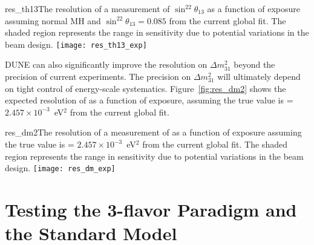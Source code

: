 \begin{cdrfigure}{res_th13}{The resolution of a measurement of $\sin^22\theta_{13}$ as a function of exposure assuming normal MH and $\sin^22\theta_{13} = 0.085$ from the current global fit. The shaded region represents the range in sensitivity due to potential variations in the beam design.  }
 \texttt{[image: res\_th13\_exp]}
\end{cdrfigure}

DUNE can also significantly improve the
resolution on $\Delta m^2_{31}$ beyond the precision of current experiments.  The
precision on $\Delta m^2_{31}$ will ultimately depend on tight control
of energy-scale systematics.  Figure~\ref{fig:res_dm2} shows the expected resolution of  as a function of exposure, assuming the true value is  = $2.457\times10^{-3}$~eV$^2$ from the current global fit.

\begin{cdrfigure}{res_dm2}{The resolution of a measurement of  as a function of exposure assuming the true value is  = $2.457\times10^{-3}$~eV$^2$ from the current global fit. The shaded region represents the range in sensitivity due to potential variations in the beam design.  }
 \texttt{[image: res\_dm\_exp]}
\end{cdrfigure}

\section{Testing the 3-flavor Paradigm and the Standard Model}
\label{sec:physics-lbnosc-3nutests}

